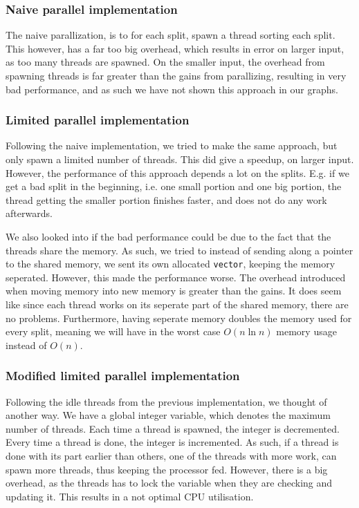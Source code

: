 \subsubsection{Naive parallel implementation}
The naive parallization, is to for each split, spawn a thread sorting each
split. This however, has a far too big overhead, which results in error on
larger input, as too many threads are spawned. On the smaller input, the
overhead from spawning threads is far greater than the gains from parallizing,
resulting in very bad performance, and as such we have not shown this approach
in our graphs.

\subsubsection{Limited parallel implementation}
Following the naive implementation, we tried to make the same approach, but
only spawn a limited number of threads. This did give a speedup, on larger
input. However, the performance of this approach depends a lot on the splits.
E.g. if we get a bad split in the beginning, i.e. one small portion and one big
portion, the thread getting the smaller portion finishes faster, and does not
do any work afterwards.

We also looked into if the bad performance could be due to the fact that the
threads share the memory. As such, we tried to instead of sending along a
pointer to the shared memory, we sent its own allocated \texttt{vector},
keeping the memory seperated. However, this made the performance worse. The
overhead introduced when moving memory into new memory is greater than the
gains. It does seem like since each thread works on its seperate part of the
shared memory, there are no problems. Furthermore, having seperate memory
doubles the memory used for every split, meaning we will have in the worst case
$O(n \ln n)$ memory usage instead of $O(n)$.

\subsubsection{Modified limited parallel implementation}
Following the idle threads from the previous implementation, we thought of
another way. We have a global integer variable, which denotes the maximum
number of threads. Each time a thread is spawned, the integer is decremented.
Every time a thread is done, the integer is incremented. As such, if a thread
is done with its part earlier than others, one of the threads with more work,
can spawn more threads, thus keeping the processor fed. However, there is a big
overhead, as the threads has to lock the variable when they are checking and
updating it. This results in a not optimal CPU utilisation.

